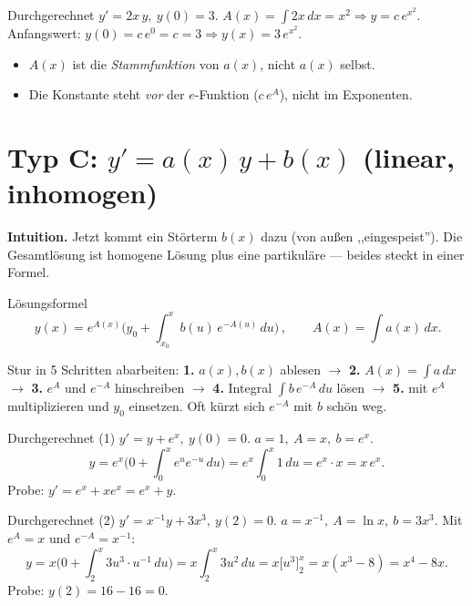 \documentclass[a4paper,11pt]{article}
\begin{document}
\begin{bspbox}{Durchgerechnet}
$y'=2x\,y,\ y(0)=3$. \quad $A(x)=\int 2x\,dx=x^2 \Rightarrow y=c\,e^{x^2}$.
Anfangswert: $y(0)=c\,e^0=c=3 \Rightarrow y(x)=3\,e^{x^2}$.
\end{bspbox}

\begin{fehlerbox}
\begin{itemize}[leftmargin=1.4em,itemsep=2pt]
  \item $A(x)$ ist die \emph{Stammfunktion} von $a(x)$, nicht $a(x)$ selbst.
  \item Die Konstante steht \emph{vor} der $e$-Funktion ($c\,e^{A}$), nicht im Exponenten.
\end{itemize}
\end{fehlerbox}

\section{Typ C: $y'=a(x)\,y+b(x)$ (linear, inhomogen)}

\textbf{Intuition.} Jetzt kommt ein Störterm $b(x)$ dazu (von außen ,,eingespeist''). Die
Gesamtlösung ist homogene Lösung plus eine partikuläre — beides steckt in einer Formel.

\begin{satzbox}{Lösungsformel}
\[
  \boxed{\,y(x)=e^{A(x)}\Big(y_0+\int_{x_0}^{x} b(u)\,e^{-A(u)}\,du\Big)\,},
  \qquad A(x)=\int a(x)\,dx.
\]
\end{satzbox}

\begin{merkbox}
Stur in 5 Schritten abarbeiten:
\textbf{1.} $a(x),b(x)$ ablesen $\to$ \textbf{2.} $A(x)=\int a\,dx$ $\to$
\textbf{3.} $e^{A}$ und $e^{-A}$ hinschreiben $\to$ \textbf{4.} Integral $\int b\,e^{-A}\,du$
lösen $\to$ \textbf{5.} mit $e^{A}$ multiplizieren und $y_0$ einsetzen.
Oft kürzt sich $e^{-A}$ mit $b$ schön weg.
\end{merkbox}

\begin{bspbox}{Durchgerechnet (1)}
$y'=y+e^{x},\ y(0)=0$. \quad $a=1,\ A=x,\ b=e^x$.
\[
  y=e^{x}\Big(0+\int_0^x e^{u}e^{-u}\,du\Big)=e^x\int_0^x 1\,du=e^x\cdot x = x\,e^x.
\]
Probe: $y'=e^x+xe^x=e^x+y$. \checkmark
\end{bspbox}

\begin{bspbox}{Durchgerechnet (2)}
$y'=x^{-1}y+3x^{3},\ y(2)=0$. \quad $a=x^{-1},\ A=\ln x,\ b=3x^3$. \;
Mit $e^{A}=x$ und $e^{-A}=x^{-1}$:
\[
  y=x\Big(0+\int_2^x 3u^3\cdot u^{-1}\,du\Big)=x\int_2^x 3u^2\,du
   =x\big[u^3\big]_2^x=x(x^3-8)=x^4-8x.
\]
Probe: $y(2)=16-16=0$. \checkmark
\end{bspbox}
\end{document}
